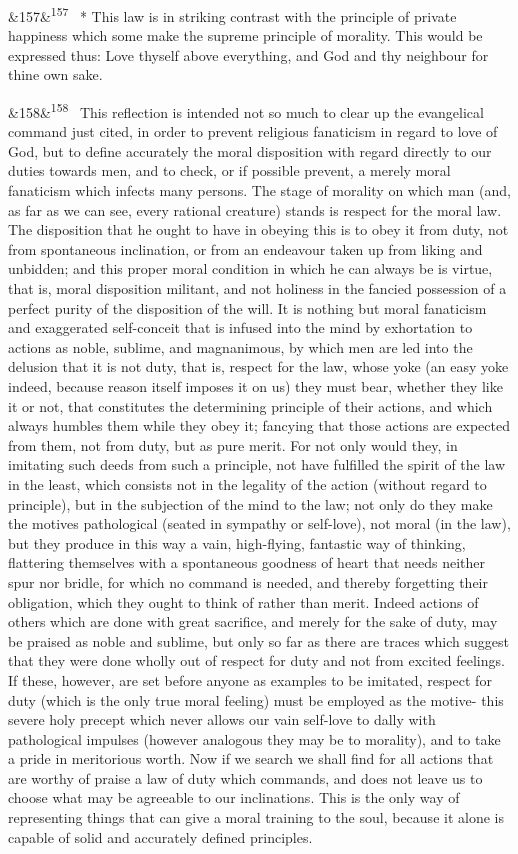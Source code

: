 \documentclass[12pt]{article}
\newcommand{\para}[1][]{\par\noindent\ifx&#1&\else\textsuperscript{\footnotesize #1}~\fi}
\begin{document}
\para[157] * This law is in striking contrast with the principle of private happiness which some make the supreme principle of morality. This would be expressed thus: Love thyself above everything, and God and thy neighbour for thine own sake.

\para[158] This reflection is intended not so much to clear up the evangelical command just cited, in order to prevent religious fanaticism in regard to love of God, but to define accurately the moral disposition with regard directly to our duties towards men, and to check, or if possible prevent, a merely moral fanaticism which infects many persons. The stage of morality on which man (and, as far as we can see, every rational creature) stands is respect for the moral law. The disposition that he ought to have in obeying this is to obey it from duty, not from spontaneous inclination, or from an endeavour taken up from liking and unbidden; and this proper moral condition in which he can always be is virtue, that is, moral disposition militant, and not holiness in the fancied possession of a perfect purity of the disposition of the will. It is nothing but moral fanaticism and exaggerated self-conceit that is infused into the mind by exhortation to actions as noble, sublime, and magnanimous, by which men are led into the delusion that it is not duty, that is, respect for the law, whose yoke (an easy yoke indeed, because reason itself imposes it on us) they must bear, whether they like it or not, that constitutes the determining principle of their actions, and which always humbles them while they obey it; fancying that those actions are expected from them, not from duty, but as pure merit. For not only would they, in imitating such deeds from such a principle, not have fulfilled the spirit of the law in the least, which consists not in the legality of the action (without regard to principle), but in the subjection of the mind to the law; not only do they make the motives pathological (seated in sympathy or self-love), not moral (in the law), but they produce in this way a vain, high-flying, fantastic way of thinking, flattering themselves with a spontaneous goodness of heart that needs neither spur nor bridle, for which no command is needed, and thereby forgetting their obligation, which they ought to think of rather than merit. Indeed actions of others which are done with great sacrifice, and merely for the sake of duty, may be praised as noble and sublime, but only so far as there are traces which suggest that they were done wholly out of respect for duty and not from excited feelings. If these, however, are set before anyone as examples to be imitated, respect for duty (which is the only true moral feeling) must be employed as the motive- this severe holy precept which never allows our vain self-love to dally with pathological impulses (however analogous they may be to morality), and to take a pride in meritorious worth. Now if we search we shall find for all actions that are worthy of praise a law of duty which commands, and does not leave us to choose what may be agreeable to our inclinations. This is the only way of representing things that can give a moral training to the soul, because it alone is capable of solid and accurately defined principles.
\end{document}

